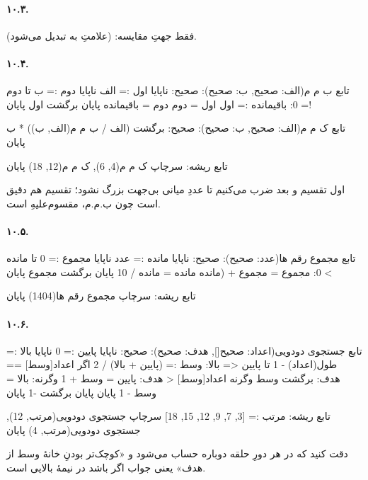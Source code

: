 \paragraph{۱۰.۳.} فقط جهتِ مقایسه: 
(علامتِ \code{>} به \code{<} تبدیل می‌شود).

\paragraph{۱۰.۴.}
\begin{salamfa}
تابع ب م م(الف: صحیح, ب: صحیح): صحیح:
    ناپایا اول := الف
    ناپایا دوم := ب
    تا دوم != 0:
        باقیمانده := اول %
        اول = دوم
        دوم = باقیمانده
    پایان
    برگشت اول
پایان

تابع ک م م(الف: صحیح, ب: صحیح): صحیح:
    برگشت (الف / ب م م(الف, ب)) * ب
پایان

تابع ریشه:
    سرچاپ ک م م(4, 6), ک م م(12, 18)
پایان
\end{salamfa}
اول تقسیم و بعد ضرب می‌کنیم تا عددِ میانی بی‌جهت بزرگ نشود؛ تقسیم هم
دقیق است چون ب.م.م، مقسوم‌علیهِ  است.

\paragraph{۱۰.۵.}
\begin{salamfa}
تابع مجموع رقم ها(عدد: صحیح): صحیح:
    ناپایا مانده := عدد
    ناپایا مجموع := 0
    تا مانده > 0:
        مجموع = مجموع + (مانده %
        مانده = مانده / 10
    پایان
    برگشت مجموع
پایان

تابع ریشه:
    سرچاپ مجموع رقم ها(1404)
پایان
\end{salamfa}

\paragraph{۱۰.۶.}
\begin{salamfa}
تابع جستجوی دودویی(اعداد: صحیح[], هدف: صحیح): صحیح:
    ناپایا پایین := 0
    ناپایا بالا := طول(اعداد) - 1
    تا پایین <= بالا:
        وسط := (پایین + بالا) / 2
        اگر اعداد[وسط] == هدف:
            برگشت وسط
        وگرنه اعداد[وسط] < هدف:
            پایین = وسط + 1
        وگرنه:
            بالا = وسط - 1
        پایان
    پایان
    برگشت -1
پایان

تابع ریشه:
    مرتب := [3, 7, 9, 12, 15, 18]
    سرچاپ جستجوی دودویی(مرتب, 12), جستجوی دودویی(مرتب, 4)
پایان
\end{salamfa}
دقت کنید که  در هر دورِ حلقه دوباره حساب می‌شود و «کوچک‌تر
بودنِ خانهٔ وسط از هدف» یعنی جواب اگر باشد در نیمهٔ بالایی است.


